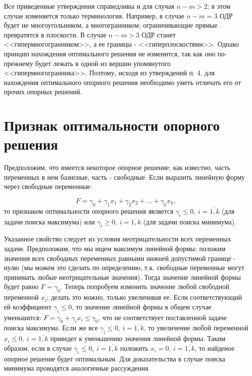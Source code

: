 \documentclass[a4paper,12pt]{report}
\begin{document}
Все приведенные утверждения справедливы и для случая $n - m > 2$; в этом случае изменяется только терминология. Например, в случае $n - m = 3$ ОДР будет не многоугольником, а многогранником; ограничивающие прямые превратятся в плоскости. В случае $n - m > 3$ ОДР станет <<гипермногогранником>>, а ее границы - <<гиперплоскостями>>. Однако принцип нахождения оптимального решения не изменится, так как оно по-прежнему будет лежать в одной из вершин упомянутого <<гипермногогранника>>. Поэтому, исходя из утверждений п. 4, для нахождения оптимального опорного решения необходимо уметь отличать его от прочих опорных решений.

\section{Признак оптимальности опорного решения}
\label{sec:lp_opt_sol}
Предположим, что имеется некоторое опорное решение; как известно, часть переменных в нем базисные, часть - свободные. Если выразить линейную форму через свободные переменные:

\begin{equation*}
F = \gamma_{0} + \gamma_{1}x_{1} + \gamma_{2}x_{2} + \ldots + \gamma_{k}x_{k},
\end{equation*}
то признаком оптимальности опорного решения является $\gamma_{i} \leq 0,\ i=\overline{1,k}$ (для задачи поиска максимума) или $\gamma_{i} \geq 0,\ i=\overline{1,k}$ (для задачи поиска минимума).

Указанное свойство следует из условия неотрицательности всех переменных задачи. Предположим, что мы ищем максимум линейной формы; положим значения всех свободных переменных равными нижней допустимой границе - нулю (мы можем это сделать по определению, т.к. свободные переменные могут принимать любые неотрицательные значения). Тогда значение линейной формы будет равно $F = \gamma_{0}$. Теперь попробуем изменить значение любой свободной переменной $x_{i}$; делать это можно, только увеличивая ее. Если соответствующий ей коэффициент $\gamma_{i} \leq 0$, то значение линейной формы в общем случае уменьшится: $F = \gamma_{0} + \gamma_{i}x_{i} \leq \gamma_{0}$, что не соответствует поставленной задаче поиска максимума. Если же все $\gamma_{i} \leq 0,\ i=\overline{1,k}$, то увеличение любой переменной $x_{i} \leq 0,\ i=\overline{1,k}$ приведет к уменьшению значения линейной формы. Таким образом, если в случае $\gamma_{i} \leq 0,\ i=\overline{1,k}$ положить $x_{i} = 0,\ i=\overline{1,k}$, то найденое опорное решение будет оптимальным. Для доказательства в случае поиска минимума проводятся аналогичные рассуждения.
\end{document}
